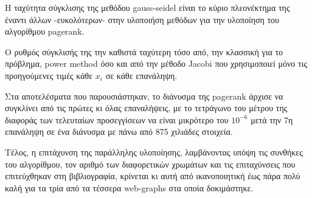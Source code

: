 Η ταχύτητα σύγκλισης της μεθόδου gauss-seidel είναι το κύριο πλεονέκτημα της έναντι άλλων -ευκολότερων- στην υλοποιήση μεθόδων για την υλοποίηση του αλγορίθμου pagerank.  

Ο ρυθμός σύγκλισής της την καθιστά ταχύτερη τόσο από, την κλασσική για το πρόβλημα, power method\parencite{silvestrepagerank} όσο και από την μέθοδο Jacobi που χρησιμοποιεί μόνο τις προηγούμενες τιμές κάθε $x_i$ σε κάθε επανάληψη.

Στα αποτελέσματα που παρουσιάστηκαν, το διάνυσμα της pagerank άρχισε να συγκλίνει από τις πρώτες κι όλας επαναλήψεις, με το τετράγωνο του μέτρου της διαφοράς των τελευταίων προσεγγίσεων να είναι μικρότερο του $10^{-6}$ μετά την 7η επανάληψη σε ένα διάνυσμα με πάνω από 875 χιλιάδες στοιχεία.

Τέλος, η επιτάχυνση της παράλληλης υλοποίησης, λαμβάνοντας υπόψη τις συνθήκες του αλγορίθμου, τον αριθμό των διαφορετικών χρωμάτων και τις επιταχύνσεις που επιτεύχθηκαν στη βιβλιογραφία\parencite{hasenplaugh2016parallel}, κρίνεται κι αυτή από ικανοποιητική έως πάρα πολύ καλή για τα τρία από τα τέσσερα web-graphs στα οποία δοκιμάστηκε.